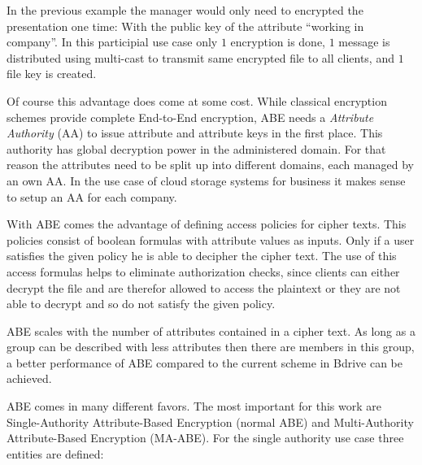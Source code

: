 In the previous example the manager would only need to encrypted the presentation one time: With the public key of the attribute “working in company”. In this participial use case only $1$ encryption is done, $1$ message is distributed using multi-cast to transmit same encrypted file to all clients, and $1$ file key is created. 

Of course this advantage does come at some cost. While classical encryption schemes provide complete End-to-End encryption, ABE needs a \textit{Attribute Authority} (\ac{AA}) to issue attribute and attribute keys in the first place. This authority has global decryption power in the administered domain. For that reason the attributes need to be split up into different domains, each managed by an own AA. In the use case of cloud storage systems for business it makes sense to setup an AA for each company. 

With ABE comes the advantage of defining access policies for cipher texts. This policies consist of boolean formulas with attribute values as inputs. Only if a user satisfies the given policy he is able to decipher the cipher text. The use of this access formulas helps to eliminate authorization checks, since clients can either decrypt the file and are therefor allowed to access the plaintext or they are not able to decrypt and so do not satisfy the given policy. 


ABE scales with the number of attributes contained in a cipher text. As long as a group can be described with less attributes then there are members in this group, a better performance of ABE compared to the current scheme in Bdrive can be achieved. 

ABE comes in many different favors. The most important for this work are Single-Authority Attribute-Based Encryption (normal \ac{ABE}) and Multi-Authority Attribute-Based Encryption (\ac{MA-ABE}). 
For the single authority use case three entities are defined:


